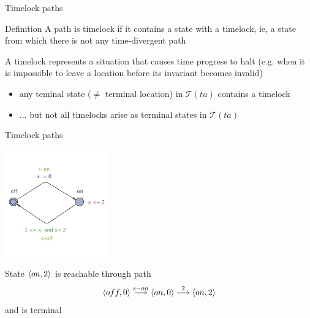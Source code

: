 \documentclass{beamer}
\def\dgold#1{{\darkgoldenrod #1}}
\def\dkb#1{{\blue #1}}
\def\TL#1{\mathcal{T}(#1)}
\begin{document}
\begin{slide}{Timelock paths}
\small

\begin{block}{Definition}
A path is \dkb{timelock} if it contains a state with a timelock, ie, a \dgold{state
from which there is not any time-divergent path}
\vspace{0.3cm}

A \dkb{timelock} represents a situation that causes time progress to halt (e.g. when it is impossible to leave a location before its invariant becomes invalid)
\end{block}

\begin{itemize}
\item any \dkb{teminal state} ($\neq$ terminal location) in $\TL{ta}$ contains a timelock
\item ... but not all timelocks arise as terminal states in $\TL{ta}$
\end{itemize}
\end{slide}



\begin{slide}{Timelock paths}
\small

\begin{center}
  \includegraphics[width=4.5cm]{./images/SwitchB} 
\end{center}

State $\mathopen{\langle}on,2\mathclose{\rangle}$ is reachable through path 
$$\mathopen{\langle}off,0\mathclose{\rangle} \stackrel{s-on}{\longrightarrow} \mathopen{\langle}on,0\mathclose{\rangle} \stackrel{2}{\longrightarrow} \mathopen{\langle}on,2\mathclose{\rangle}$$
and is terminal

\end{slide}
\end{document}
